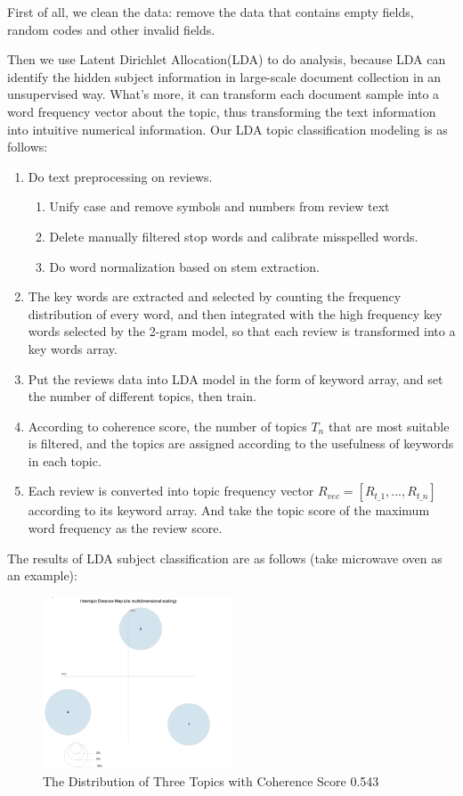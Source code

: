 \documentclass{mcmthesis}
\begin{document}
First of all, we clean the data: remove the data that contains empty fields, random codes and other invalid fields. 

Then we use Latent Dirichlet Allocation(LDA)\cite{blei2003latent} to do analysis, because LDA can identify the hidden subject information in large-scale document collection in an unsupervised way. What's more, it can transform each document sample into a word frequency vector about the topic, thus transforming the text information into intuitive numerical information. Our LDA topic classification modeling is as follows:
\begin{enumerate}
	\item Do text preprocessing on reviews.
		\begin{enumerate}
			\item Unify case and remove symbols and numbers from review text
			\item Delete manually filtered stop words and calibrate misspelled words.
			\item Do word normalization based on stem extraction.
		\end{enumerate}
	\item The key words are extracted and selected by counting the frequency distribution of every word, and then integrated with the high frequency key words selected by the 2-gram model\cite{zhang2006lord}, so that each review is transformed into a key words array.
	\item Put the reviews data into LDA model in the form of  keyword array, and set the number of different topics, then train.
	\item According to coherence score, the number of topics $T_{n}$ that are most suitable is filtered, and the topics are assigned according to the usefulness of keywords in each topic.
	\item Each review is converted into topic frequency vector $R_{vec}=[R_{t\_1},...,R_{t\_n}]$  according to its keyword array. And take the topic score of the maximum word frequency as the review score.
\end{enumerate}
The results of LDA subject classification are as follows (take microwave oven as an example):\\
\begin{figure}[H] %
	\centering %
	\includegraphics[width=0.5\textwidth]{figures/topic_distribution.png} %
	\caption{The Distribution of Three Topics with Coherence Score 0.543} %
	\label{fig4} %
\end{figure}
\end{document}
